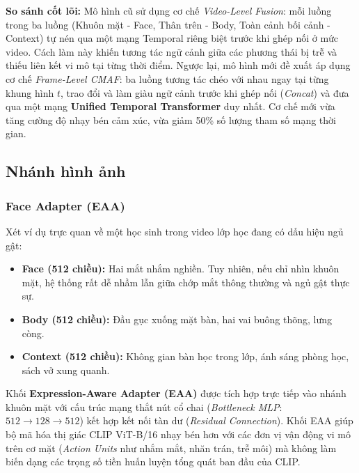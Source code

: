 \documentclass[10pt,a4paper]{article}
\begin{document}
\noindent\textbf{So sánh cốt lõi:} Mô hình cũ sử dụng cơ chế \textit{Video-Level Fusion}: mỗi luồng trong ba luồng (Khuôn mặt - Face, Thân trên - Body, Toàn cảnh bối cảnh - Context) tự nén qua một mạng Temporal riêng biệt trước khi ghép nối ở mức video. Cách làm này khiến tương tác ngữ cảnh giữa các phương thái bị trễ và thiếu liên kết vi mô tại từng thời điểm. Ngược lại, mô hình mới đề xuất áp dụng cơ chế \textit{Frame-Level CMAF}: ba luồng tương tác chéo với nhau ngay tại từng khung hình $t$, trao đổi và làm giàu ngữ cảnh trước khi ghép nối (\textit{Concat}) và đưa qua một mạng \textbf{Unified Temporal Transformer} duy nhất. Cơ chế mới vừa tăng cường độ nhạy bén cảm xúc, vừa giảm 50\% số lượng tham số mạng thời gian.

\subsection{Nhánh hình ảnh}

\subsubsection{Face Adapter (EAA)}
Xét ví dụ trực quan về một học sinh trong video lớp học đang có dấu hiệu ngủ gật:
\begin{itemize}[leftmargin=18pt, itemsep=1pt]
    \item \textbf{Face (512 chiều):} Hai mắt nhắm nghiền. Tuy nhiên, nếu chỉ nhìn khuôn mặt, hệ thống rất dễ nhầm lẫn giữa chớp mắt thông thường và ngủ gật thực sự.
    \item \textbf{Body (512 chiều):} Đầu gục xuống mặt bàn, hai vai buông thõng, lưng còng.
    \item \textbf{Context (512 chiều):} Không gian bàn học trong lớp, ánh sáng phòng học, sách vở xung quanh.
\end{itemize}

Khối \textbf{Expression-Aware Adapter (EAA)} được tích hợp trực tiếp vào nhánh khuôn mặt với cấu trúc mạng thắt nút cổ chai (\textit{Bottleneck MLP}: $512 \rightarrow 128 \rightarrow 512$) kết hợp kết nối tàn dư (\textit{Residual Connection}). Khối EAA giúp bộ mã hóa thị giác CLIP ViT-B/16 nhạy bén hơn với các đơn vị vận động vi mô trên cơ mặt (\textit{Action Units} như nhắm mắt, nhăn trán, trễ môi) mà không làm biến dạng các trọng số tiền huấn luyện tổng quát ban đầu của CLIP.

\end{document}
